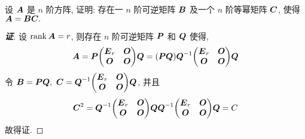 \begin{example}
    设 $\vb*{A}$ 是 $n$ 阶方阵, 证明: 存在一 $n$ 阶可逆矩阵 $\vb*{B}$ 及一个 $n$ 阶等幂矩阵 $\vb*{C}$, 使得 $\vb*{A}=\vb*{BC}.$
\end{example}
\begin{proof}[{\songti \textbf{证}}]
    设 $\rank\vb*{A}=r$, 则存在 $n$ 阶可逆矩阵 $\vb*{P}$ 和 $\vb*{Q}$ 使得, 
    $$\vb*{A}=\vb*{P}\mqty(\vb*{E}_r&\vb*{O}\\\vb*{O}&\vb*{O})\vb*{Q}=(\vb*{PQ})\vb*{Q}^{-1}\mqty(\vb*{E}_r&\vb*{O}\\\vb*{O}&\vb*{O})\vb*{Q}$$
    令 $\vb*{B}=\vb*{PQ},~\vb*{C}=\vb*{Q}^{-1}\mqty(\vb*{E}_r&\vb*{O}\\\vb*{O}&\vb*{O})\vb*{Q}$, 并且
    $$\vb*{C}^2=\vb*{Q}^{-1}\mqty(\vb*{E}_r&\vb*{O}\\\vb*{O}&\vb*{O})\vb*{Q}\vb*{Q}^{-1}\mqty(\vb*{E}_r&\vb*{O}\\\vb*{O}&\vb*{O})\vb*{Q}=C$$
    故得证.
\end{proof}

